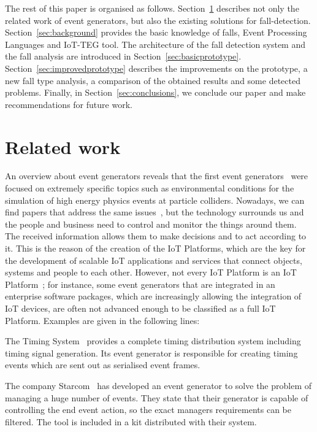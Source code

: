 \documentclass[conference]{IEEEtran}
\theoremstyle{definition}
\begin{document}
The rest of this paper is organised as follows. Section~\ref{sec:relatedwork}
describes not only the related work of event generators, but also the existing
solutions for fall-detection. Section~\ref{sec:background} provides the basic
knowledge of falls, Event Processing Languages and IoT-TEG tool. The architecture
of the fall detection system and the fall analysis are 
introduced in Section~\ref{sec:basicprototype}. Section~\ref{sec:improvedprototype}
describes the improvements on the prototype, a new fall type analysis,
a comparison of the obtained results and some detected problems. Finally, in Section~\ref{sec:conclusions}, 
we conclude our paper and make recommendations for future work.

\section{Related work}
\label{sec:relatedwork}

An overview about event generators reveals that the first event generators~\cite{dobbs2004houches,mangano2005tools}
were focused on extremely specific topics such as environmental conditions for the simulation of high energy 
physics events at particle colliders. Nowadays, we can find papers that address the same issues~\cite{Grzegorczyk}, but 
the technology surrounds us and the people and business need to control and monitor the things around them. 
The received information allows them to make decisions and to act according to it. This is the reason 
of the creation of the IoT Platforms, which are the key for the development of scalable IoT applications and 
services that connect objects, systems and people to each other. However, not every IoT Platform is an IoT 
Platform~\cite{iot-analytics:2015}; for instance, some event generators that are integrated in an enterprise 
software packages, which are increasingly allowing the integration of IoT devices, are often not advanced enough
to be classified as a full IoT Platform. Examples are given in the following lines:

The Timing System~\cite{Finland:2016} provides a complete timing distribution system including timing signal generation. Its event
generator is responsible for creating timing events which are sent out as serialised event frames.

The company Starcom~\cite{Starcom:2016} has developed an event generator to solve the problem of managing a huge number of
events. They state that their generator is capable of controlling the end event action, so the exact managers requirements can
be filtered. The tool is included in a kit distributed with their system.
\end{document}
